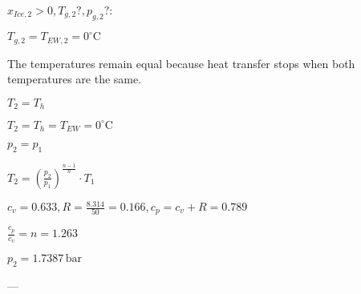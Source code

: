 \( x_{Ice,2} > 0, T_{g,2}?, p_{g,2}? \):  

\( T_{g,2} = T_{EW,2} = 0^\circ \text{C} \)  

The temperatures remain equal because heat transfer stops when both temperatures are the same.  

\( T_2 = T_h \)  

\( T_2 = T_h = T_{EW} = 0^\circ \text{C} \)  

\( p_2 = p_1 \)  

\( T_2 = \left( \frac{p_2}{p_1} \right)^{\frac{n - 1}{n}} \cdot T_1 \)  

\( c_v = 0.633, R = \frac{8.314}{50} = 0.166, c_p = c_v + R = 0.789 \)  

\( \frac{c_p}{c_v} = n = 1.263 \)  

\( p_2 = 1.7387 \, \text{bar} \)  

---